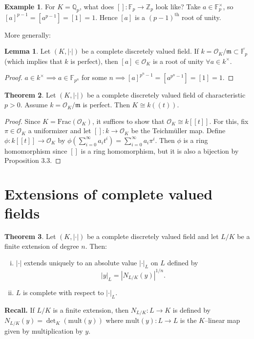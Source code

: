 \documentclass{article}
\theoremstyle{definition}
\newtheorem{theorem}{Theorem}[section]
\newtheorem{lemma}[theorem]{Lemma}
\newtheorem{example}{Example}[section]
\begin{document}
\begin{example}
    For $K=\mathbb{Q}_p$, what does $[]: \mathbb{F}_p \to \mathbb{Z}_p$ look like? Take $a \in \mathbb{F}_p^\times$, so $[a]^{p-1}=[a^{p-1}] = [1] = 1$. Hence $[a]$ is a $(p-1)^{\text{th}}$ root of unity.
\end{example}
More generally:
\begin{lemma}
    Let $(K,|\cdot|)$ be a complete discretely valued field. If $k = \mathcal{O}_K/\mathfrak{m} \subset \overline{\mathbb{F}_p}$ (which implies that $k$ is perfect), then $[a] \in \mathcal{O}_K$ is a root of unity $\forall a \in k^\times$.
\end{lemma}
\begin{proof}
    $a \in k^\times \implies a \in \mathbb{F}_{p^n}$ for some $n \implies [a]^{p^n-1}=[a^{p^n-1}] = [1] = 1$.
\end{proof}
\begin{theorem}
    Let $(K, |\cdot|)$ be a complete discretely valued field of characteristic $p > 0$. Assume $k = \mathcal{O}_K/\mathfrak{m}$ is perfect. Then $K \cong k((t))$.
\end{theorem}
\begin{proof}
    Since $K = \text{Frac}(\mathcal{O}_K)$, it suffices to show that $\mathcal{O}_K \cong k[[t]]$. For this, fix $\pi \in \mathcal{O}_K$ a uniformizer and let $[]: k \to \mathcal{O}_K$ be the Teichmüller map. Define $\phi : k[[t]] \to \mathcal{O}_K$ by $\phi\left(\sum_{i=0}^{\infty} a_i t^i \right) = \sum_{i=0}^{\infty} a_i \pi^i$. Then $\phi$ is a ring homomorphism since $[]$ is a ring homomorphism, but it is also a bijection by Proposition 3.3.
\end{proof}

\section{Extensions of complete valued fields}


\begin{theorem}
    Let $(K,|\cdot|)$ be a complete discretely valued field and let $L/K$ be a finite extension of degree $n$. Then:
    \begin{enumerate}[(i)]
        \item $|\cdot|$ extends uniquely to an absolute value $|\cdot|_L$ on $L$ defined by $$|y|_L = |N_{L/K}(y)|^{1/n}.$$
        \item $L$ is complete with respect to $|\cdot|_L$.
    \end{enumerate}
\end{theorem}
\textbf{Recall.} If $L/K$ is a finite extension, then $N_{L/K}: L \to K$ is defined by $N_{L/K}(y) = \det_K(\text{mult}(y))$ where $\text{mult}(y): L \to L$ is the $K$--linear map given by multiplication by $y$.
\vspace{1mm}
 
\end{document}
